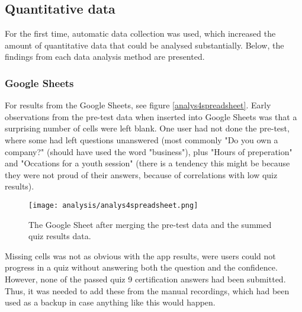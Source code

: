 \subsection{Quantitative data}






For the first time, automatic data collection was used, which increased the amount of quantitative data that could be analysed substantially. Below, the findings from each data analysis method are presented.

\subsubsection{Google Sheets} 
For results from the Google Sheets, see figure \ref{analys4spreadsheet}. Early observations from the pre-test data when inserted into Google Sheets was that a surprising number of cells were left blank. One user had not done the pre-test, where some had left questions unanswered (most commonly "Do you own a company?" (should have used the word "business"), plus "Hours of preperation" and "Occations for a youth session" (there is a tendency this might be because they were not proud of their answers, because of correlations with low quiz results).

\begin{figure}[h]
    \centering
    \texttt{[image: analysis/analys4spreadsheet.png]}
    \caption{The Google Sheet after merging the pre-test data and the summed quiz results data.}
    \label{fig:analys4spreadsheet}
\end{figure}

Missing cells was not as obvious with the app results, were users could not progress in a quiz without answering both the question and the confidence. However, none of the passed quiz 9 certification answers had been submitted. Thus, it was needed to add these from the manual recordings, which had been used as a backup in case anything like this would happen.

